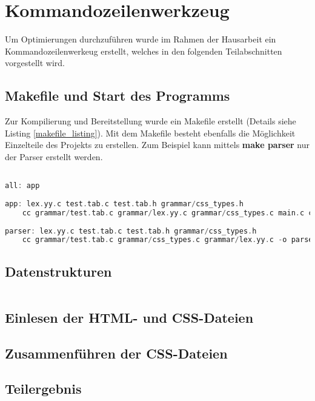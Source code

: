 \section{Kommandozeilenwerkzeug}
Um Optimierungen durchzuführen wurde im Rahmen der Hausarbeit ein Kommandozeilenwerkeug erstellt, welches in den folgenden Teilabschnitten vorgestellt wird.

\subsection{Makefile und Start des Programms}
Zur Kompilierung und Bereitstellung wurde ein Makefile erstellt (Details siehe Listing \ref{makefile_listing}). Mit dem Makefile besteht ebenfalls die Möglichkeit Einzelteile des Projekts zu erstellen. Zum Beispiel kann mittels \textbf{make parser} nur der Parser erstellt werden.
\begin{lstlisting}[label=makefile_listing,language=C, caption=Auszug aus dem Makefile des Projekt]

all: app
	
app: lex.yy.c test.tab.c test.tab.h grammar/css_types.h
	cc grammar/test.tab.c grammar/lex.yy.c grammar/css_types.c main.c cli_parse.c css_merge.c guiCSS.c optimizer.c output.c -lncurses -o optimCSS
	
parser: lex.yy.c test.tab.c test.tab.h grammar/css_types.h
	cc grammar/test.tab.c grammar/css_types.c grammar/lex.yy.c -o parser

\end{lstlisting}

\subsection{Datenstrukturen}

\begin{lstlisting}[label=datastructures_listing,language=C, caption=Datenstrukturen]

\end{lstlisting}

\subsection{Einlesen der HTML- und CSS-Dateien}

\subsection{Zusammenführen der CSS-Dateien}

\subsection{Teilergebnis}
